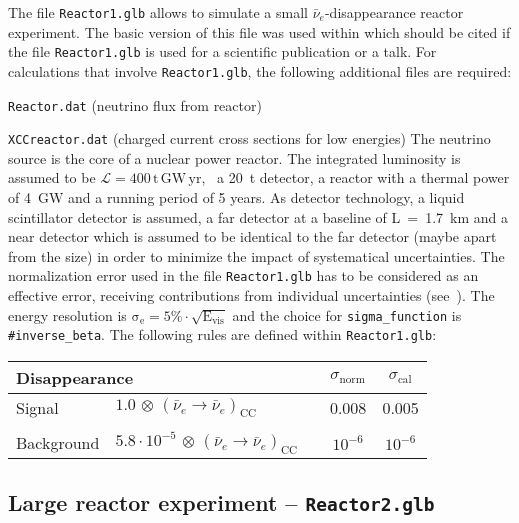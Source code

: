 The file {\tt Reactor1.glb} allows to simulate a small $\bar{\nu}_e$-disappearance reactor experiment. The basic
version of this file was used within \cite{Huber:2003pm} which should be cited if the file {\tt Reactor1.glb} is
used for a scientific publication or a talk. For calculations that involve {\tt Reactor1.glb}, the following
additional files are required:
\bi
\item {\tt Reactor.dat} (neutrino flux from reactor)
\item {\tt XCCreactor.dat} (charged current cross sections for low energies)
\ei
The neutrino source is the core of a nuclear power reactor. The integrated luminosity is assumed to be
$\mathrm{\mathcal{L} = 400 \,t \, GW\, yr}$, \eg\ a 20~t detector, a reactor with a thermal power of 4~GW
and a running period of 5 years. As detector technology, a liquid scintillator 
detector is assumed, a far detector at a baseline of L~=~1.7~km and a near detector which is
assumed to be identical to the far detector (maybe apart from the size) in order to minimize the impact of systematical uncertainties. The normalization error
used in the file {\tt Reactor1.glb} has to be considered as an effective error, receiving contributions from
individual uncertainties (see~\cite{Huber:2003pm}). The energy resolution is
$\mathrm{\sigma_e=5\%\cdot\sqrt{E_{vis}}}$ and the choice for {\tt sigma\_function} is {\tt \#inverse\_beta}. The following rules are defined within {\tt Reactor1.glb}: 
\begin{center}
\begin{tabular}{|l|ll|c|c|}
\hline \hline
\multicolumn{3}{|l|}{Disappearance} & $\sigma_\mathrm{norm}$ & $\sigma_\mathrm{cal}$ \\ \hline 
Signal & $1.0 \, \otimes \, (\bar{\nu}_e\rightarrow\bar{\nu}_e)_{\mathrm{CC}}$ & \hspace{5.5cm} & 0.008 & 0.005\\
 & &  & &\\
Background & $5.8\cdot 10^{-5} \, \otimes \, (\bar{\nu}_e\rightarrow\bar{\nu}_e)_\mathrm{CC}$ & \hspace{5.5cm} &
$10^{-6}$ & $10^{-6}$ \\ \hline \hline 
\end{tabular}
\end{center}

\subsection*{Large reactor experiment -- {\tt Reactor2.glb}}

